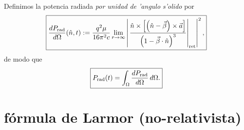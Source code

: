 Definimos la potencia radiada \textit{por unidad de 'angulo s'olido}
por
\begin{equation}
 \boxed{\frac{dP_{\rm rad}}{d\Omega}(\hat{n},t):=\frac{q^2\mu}{16\pi^2c}\lim_{r\rightarrow\infty} \left|\left.
\frac{\hat{n}\times\left[ \left( \hat{n}-\vec{\beta}\right)
\times{\vec{a}}\right] }{\left( 1-\vec{\beta}\cdot\hat{n}\right)
^3}\right|_{\rm ret}\right|^2 ,} \label{dPdO}
\end{equation}
de modo que
\begin{equation}
 \boxed{P_{\rm rad}(t)=\int_\Omega \frac{dP_{\rm rad}}{d\Omega}\,d\Omega.}
\end{equation}


\section{fórmula de Larmor (no-relativista)}\label{sec:Larmor-norel}

